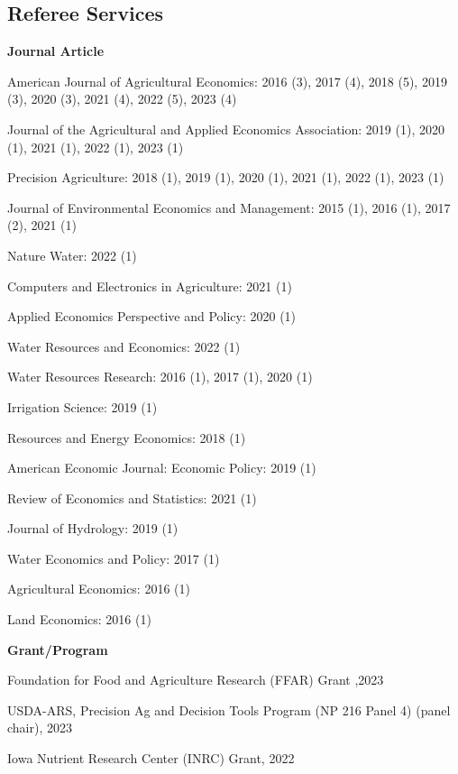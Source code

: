 \documentclass[10pt,margin,line]{res}
\newenvironment{list1}{
  \begin{list}{\ding{113}}{%
      \setlength{\itemsep}{0in}
      \setlength{\parsep}{0in} \setlength{\parskip}{0in}
      \setlength{\topsep}{0in} \setlength{\partopsep}{0in}
      \setlength{\leftmargin}{0.17in}}}{\end{list}}
\newenvironment{list2}{
  \begin{list}{-}{%
      \setlength{\itemsep}{0in}
      \setlength{\parsep}{0in} \setlength{\parskip}{0in}
      \setlength{\topsep}{0in} \setlength{\partopsep}{0in}
      \setlength{\leftmargin}{0.2in}}}{\end{list}}
\begin{document}
\begin{resume}
\section{\sc Referee Services}
\begin{list1}
  \item[] \textbf{Journal Article}
  \begin{list2}
  \item American Journal of Agricultural Economics: 2016 (3), 2017 (4), 2018 (5), 2019 (3), 2020 (3), 2021 (4), 2022 (5), 2023 (4) 
  \item Journal of the Agricultural and Applied Economics Association: 2019 (1), 2020 (1), 2021 (1),  2022 (1), 2023 (1)
  \item Precision Agriculture: 2018 (1), 2019 (1), 2020 (1), 2021 (1), 2022 (1), 2023 (1)
  \item Journal of Environmental Economics and Management: 2015 (1), 2016 (1), 2017 (2), 2021 (1)
  \item Nature Water: 2022 (1)
  \item Computers and Electronics in Agriculture: 2021 (1)
  \item Applied Economics Perspective and Policy: 2020 (1)
  \item Water Resources and Economics: 2022 (1)
  \item Water Resources Research: 2016 (1), 2017 (1), 2020 (1)
  \item Irrigation Science: 2019 (1)
  \item Resources and Energy Economics: 2018 (1)
  \item American Economic Journal: Economic Policy: 2019 (1)
  \item Review of Economics and Statistics: 2021 (1)
  \item Journal of Hydrology: 2019 (1)
  \item Water Economics and Policy: 2017 (1)
  \item Agricultural Economics: 2016 (1)
  \item Land Economics: 2016 (1)
  \end{list2}
\item[] \textbf{Grant/Program}
  \begin{list2}
  \item Foundation for Food and Agriculture Research (FFAR) Grant ,2023
  \item USDA-ARS, Precision Ag and Decision Tools Program (NP 216 Panel 4) (panel chair), 2023 
  \item Iowa Nutrient Research Center (INRC) Grant, 2022  

\end{list2}
\end{list1}
\end{resume}
\end{document}
